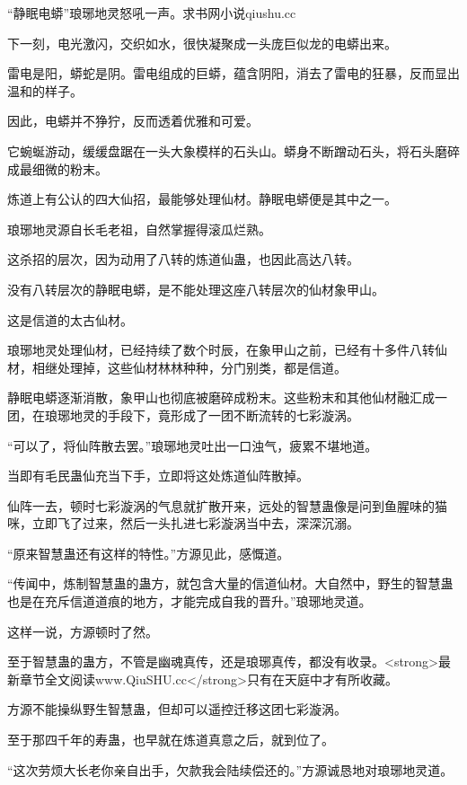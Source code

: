 
\begin{this_body}

“静眠电蟒”琅琊地灵怒吼一声。求书网小说qiushu.cc

下一刻，电光激闪，交织如水，很快凝聚成一头庞巨似龙的电蟒出来。

雷电是阳，蟒蛇是阴。雷电组成的巨蟒，蕴含阴阳，消去了雷电的狂暴，反而显出温和的样子。

因此，电蟒并不狰狞，反而透着优雅和可爱。

它蜿蜒游动，缓缓盘踞在一头大象模样的石头山。蟒身不断蹭动石头，将石头磨碎成最细微的粉末。

炼道上有公认的四大仙招，最能够处理仙材。静眠电蟒便是其中之一。

琅琊地灵源自长毛老祖，自然掌握得滚瓜烂熟。

这杀招的层次，因为动用了八转的炼道仙蛊，也因此高达八转。

没有八转层次的静眠电蟒，是不能处理这座八转层次的仙材象甲山。

这是信道的太古仙材。

琅琊地灵处理仙材，已经持续了数个时辰，在象甲山之前，已经有十多件八转仙材，相继处理掉，这些仙材林林种种，分门别类，都是信道。

静眠电蟒逐渐消散，象甲山也彻底被磨碎成粉末。这些粉末和其他仙材融汇成一团，在琅琊地灵的手段下，竟形成了一团不断流转的七彩漩涡。

“可以了，将仙阵散去罢。”琅琊地灵吐出一口浊气，疲累不堪地道。

当即有毛民蛊仙充当下手，立即将这处炼道仙阵散掉。

仙阵一去，顿时七彩漩涡的气息就扩散开来，远处的智慧蛊像是问到鱼腥味的猫咪，立即飞了过来，然后一头扎进七彩漩涡当中去，深深沉溺。

“原来智慧蛊还有这样的特性。”方源见此，感慨道。

“传闻中，炼制智慧蛊的蛊方，就包含大量的信道仙材。大自然中，野生的智慧蛊也是在充斥信道道痕的地方，才能完成自我的晋升。”琅琊地灵道。

这样一说，方源顿时了然。

至于智慧蛊的蛊方，不管是幽魂真传，还是琅琊真传，都没有收录。<strong>最新章节全文阅读www.QiuSHU.cc</strong>只有在天庭中才有所收藏。

方源不能操纵野生智慧蛊，但却可以遥控迁移这团七彩漩涡。

至于那四千年的寿蛊，也早就在炼道真意之后，就到位了。

“这次劳烦大长老你亲自出手，欠款我会陆续偿还的。”方源诚恳地对琅琊地灵道。


\end{this_body}
